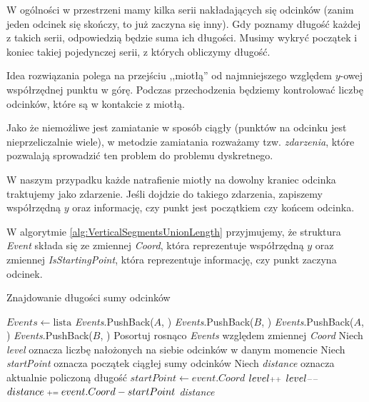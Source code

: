 W ogólności w przestrzeni mamy kilka serii
nakładających się odcinków (zanim jeden odcinek się skończy, to już zaczyna się inny). Gdy poznamy długość każdej
z takich serii, odpowiedzią będzie suma ich długości. Musimy wykryć początek i koniec takiej pojedynczej serii, 
z których obliczymy długość.

Idea rozwiązania polega na przejściu ,,miotłą'' od najmniejszego względem 
$y$-owej współrzędnej punktu w górę. Podczas przechodzenia
będziemy kontrolować liczbę odcinków, które są w kontakcie z miotłą.

Jako że niemożliwe jest zamiatanie w sposób ciągły (punktów na odcinku 
jest nieprzeliczalnie wiele), w metodzie zamiatania rozważamy 
tzw. \textit{zdarzenia}, które pozwalają sprowadzić ten problem 
do problemu dyskretnego.

W naszym przypadku każde natrafienie miotły na dowolny kraniec odcinka
traktujemy jako zdarzenie. Jeśli dojdzie do takiego zdarzenia,
zapiszemy współrzędną $y$ oraz informację, czy punkt jest początkiem czy końcem odcinka.

W algorytmie \ref{alg:VerticalSegmentsUnionLength} przyjmujemy, że
struktura \textit{Event} składa się ze zmiennej \textit{Coord}, która reprezentuje
współrzędną $y$ oraz zmiennej \textit{IsStartingPoint}, która 
reprezentuje informację, czy punkt zaczyna odcinek.

\begin{algorithm}[H]
	\caption{Znajdowanie długości sumy odcinków}
	\begin{algorithmic}[1]
		\State $Events \gets \text{lista}$
				\State \textit{Events}.PushBack($A$, \true)
				\State \textit{Events}.PushBack($B$, \false)
			\Else
				\State \textit{Events}.PushBack($A$, \false)
				\State \textit{Events}.PushBack($B$, \true)
			\EndIf
		\EndFor
		\State Posortuj rosnąco \textit{Events} względem zmiennej \textit{Coord}
		\State Niech \textit{level} oznacza liczbę nałożonych na siebie odcinków w danym momencie
		\State Niech \textit{startPoint} oznacza początek ciągłej sumy odcinków
		\State Niech \textit{distance} oznacza aktualnie policzoną długość
					\State $startPoint \gets event.Coord$
				\EndIf
				\State $level\pp$
			\Else 
				\State $level\mm$
					\State $distance \pleq event.Coord - startPoint$
				\EndIf
			\EndIf
		\EndFor
		\State \Return \textit{distance}
		\EndProcedure
	\end{algorithmic}
	\label{alg:VerticalSegmentsUnionLength}
\end{algorithm}


